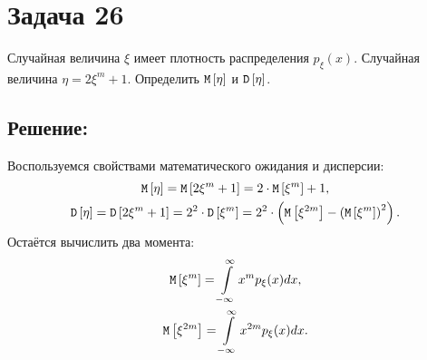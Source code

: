 \documentclass[12pt]{article}
\begin{document}
    \section*{Задача 26}

    Случайная величина $\xi$ имеет плотность распределения $p_\xi(x)$. Случайная величина $\eta = 2 \xi^m + 1$. Определить $\mathtt{M} \left [ \eta \right ]$ и $\mathtt{D} \left [ \eta \right ]$.

    \subsection*{Решение:}
    Воспользуемся свойствами математического ожидания и дисперсии:
    \begin{gather*}
        \mathtt{M} \left [ \eta \right ]
        = \mathtt{M} \left [ 2 \xi^m + 1 \right ]
        = 2 \cdot \mathtt{M} \left [ \xi^m \right ] + 1 , \\
        \mathtt{D} \left [ \eta \right ]
        = \mathtt{D} \left [ 2 \xi^m + 1 \right ]
        = 2^2 \cdot \mathtt{D} \left [ \xi^m \right ]
        = 2^2 \cdot \left ( \mathtt{M} \left [ \xi^{2m} \right ] - \left ( \mathtt{M} \left [ \xi^m \right ] \right )^2 \right ).
    \end{gather*}
    Остаётся вычислить два момента:
    \begin{gather*}
        \mathtt{M} \left [ \xi^m \right ] = \int \limits_{-\infty}^{\infty} x^m p_{\xi}(x) dx , \\
        \mathtt{M} \left [ \xi^{2m} \right ] = \int \limits_{-\infty}^{\infty} x^{2m} p_{\xi}(x) dx .
    \end{gather*}
\end{document}
